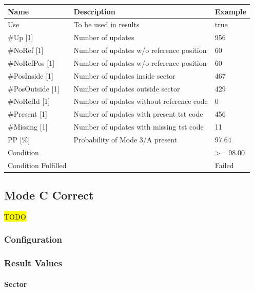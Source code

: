 \begin{center}
 \begin{table}[H]
  \begin{tabularx}{\textwidth}{ | l | X |  l | }
    \hline
    \textbf{Name} & \textbf{Description} & \textbf{Example} \\ \hline
    Use & To be used in results & true \\ \hline
    \#Up [1] & Number of updates & 956 \\ \hline
    \#NoRef [1] & Number of updates w/o reference position & 60 \\ \hline
    \#NoRefPos [1] & Number of updates w/o reference position  & 60 \\ \hline
    \#PosInside [1] & Number of updates inside sector & 467 \\ \hline
    \#PosOutside [1] & Number of updates outside sector & 429 \\ \hline
    \#NoRefId [1] & Number of updates without reference code & 0 \\ \hline
    \#Present [1] & Number of updates with present tst code & 456 \\ \hline
    \#Missing [1] & Number of updates with missing tst code & 11 \\ \hline
    PP [\%] & Probability of Mode 3/A present & 97.64 \\ \hline
    Condition &  & >= 98.00 \\ \hline
    Condition Fulfilled &  & Failed \\ \hline
\end{tabularx}
\end{table}
\end{center}

\subsection{Mode C Correct}
\label{sec:eval_req_mc_correct} 

\hl{TODO}

\subsubsection{Configuration}

\subsubsection{Result Values}

\paragraph{Sector}
